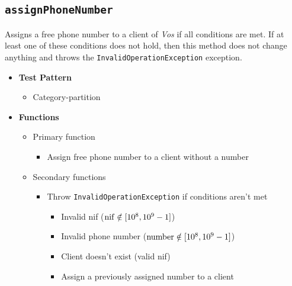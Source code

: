 \subsection{\texttt{assignPhoneNumber}}
\label{sec:methods.assignPhoneNumber}
Assigns a free phone number to a client of \textit{Vos} if all conditions are
met. If at least one of these conditions does not hold, then this method does
not change anything and throws the \texttt{InvalidOperationException} exception.
\begin{itemize}
  \large
  \item \textbf{Test Pattern}
  \begin{itemize}
    \normalsize
    \item Category-partition
  \end{itemize}

  \item \textbf{Functions}
  \begin{itemize}
    \normalsize
    \item Primary function
    \begin{itemize}
      \small
      \item Assign free phone number to a client without a number
    \end{itemize}
    \item Secondary functions
    \begin{itemize}
      \small
      \item Throw \texttt{InvalidOperationException} if conditions aren't met
        \begin{itemize}
          \footnotesize
          \item Invalid nif ($\rm{nif} \notin [10^8,10^9-1]$)
          \item Invalid phone number ($\rm{number} \notin [10^8,10^9-1]$)
          \item Client doesn't exist (valid nif)
          \item Assign a previously assigned number to a client
        \end{itemize}
    \end{itemize}
  \end{itemize}


\end{itemize}
